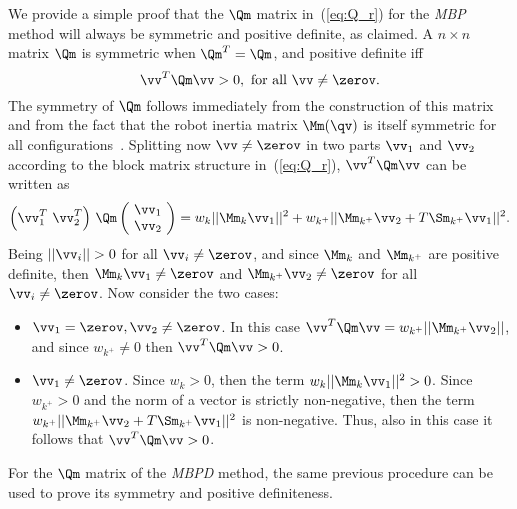 We provide a simple proof that the $\Qm$ matrix in~(\ref{eq:Q_r})  for the {\em MBP}  method will always be symmetric and positive definite, as claimed. 
A $n  \times  n $ matrix $\Qm$ is symmetric when $\Qm^T=\Qm$, and positive definite iff
\begin{equation*}
\vv^T \Qm \vv >0,\  \text{for all} \ \vv \neq \zerov.
\end{equation*}
The symmetry of $\Qm$ follows immediately from the construction of this matrix and from the fact that the robot inertia matrix $\Mm(\qv)$ is itself symmetric for all configurations~\cite{siciliano_bk08}.
Splitting now $\vv \neq \zerov$ in two parts $\vv_1$ and $\vv_2$ according to the block matrix structure in~(\ref{eq:Q_r}), $\vv^T \Qm \vv$ can be written as
\[
\left(\vv_1^T \ \vv_2^T\right) \, \Qm  \left(\!\begin{array}{c} \vv_1 \\ \vv_2 \end{array}\!\right)= w_k || \Mm_k \vv_1 ||^2 +w_ {k^{+}} ||\Mm_{k^{+}} \vv_2 + T \Sm_{k^{+}} \vv_1 ||^2.
\]
Being $||\vv_i|| >0$ for all $\vv_i \neq \zerov$, and since $\Mm_k$ and $\Mm_{k^{+}}$ are positive definite, then $\Mm_k \vv_1\neq \zerov$ and $\Mm_{k^{+}} \vv_2 \neq \zerov$ for all $\vv_i \neq \zerov$. Now consider the two cases:
\begin{itemize}
	\item $\vv_1 = \zerov, \vv_2 \neq \zerov$. In this case $\vv^T \Qm \vv =w_{k^+} ||\Mm_{k^+}\vv_2||$, and since $w_{k^+} \neq 0$ then $\vv^T \Qm \vv >0$. 
	\item $\vv_1 \neq \zerov$. Since $w_{k} >0$, then the term $w_k || \Mm_k \vv_1 ||^2 >0$. Since $w_{k^+} >0$ and the norm of a vector is strictly non-negative, then the term $w_ {k^{+}} ||\Mm_{k^{+}} \vv_2 + T \Sm_{k^{+}} \vv_1 ||^2$ is non-negative. Thus, also in this case it follows that  $\vv^T \Qm \vv >0$.    
\end{itemize}
For the $\Qm$ matrix of the {\em MBPD} method, the same previous procedure can be used to prove its symmetry and positive definiteness.  